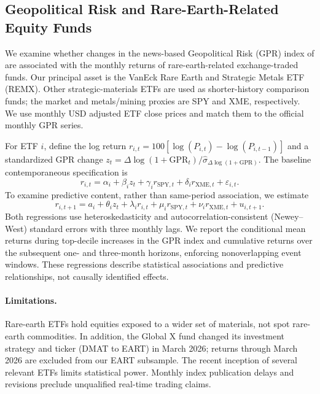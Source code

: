\subsection{Geopolitical Risk and Rare-Earth-Related Equity Funds}
We examine whether changes in the news-based Geopolitical Risk (GPR) index of
\citet{caldara_iacoviello_2022} are associated with the monthly returns of
rare-earth-related exchange-traded funds. Our principal asset is the VanEck Rare
Earth and Strategic Metals ETF (REMX). Other strategic-materials ETFs are used
as shorter-history comparison funds; the market and metals/mining proxies are
SPY and XME, respectively. We use monthly USD adjusted ETF close prices and
match them to the official monthly GPR series.

For ETF $i$, define the log return
$r_{i,t}=100[\log(P_{i,t})-\log(P_{i,t-1})]$ and a standardized GPR change
$z_t=\Delta\log(1+\mathrm{GPR}_t)/\widehat{\sigma}_{\Delta\log(1+\mathrm{GPR})}$.
The baseline contemporaneous specification is
\begin{equation}
 r_{i,t}=\alpha_i+\beta_i z_t+\gamma_i r_{\mathrm{SPY},t}
 +\delta_i r_{\mathrm{XME},t}+\varepsilon_{i,t}.
\end{equation}
To examine predictive content, rather than same-period association, we estimate
\begin{equation}
 r_{i,t+1}=a_i+\theta_i z_t+\lambda_i r_{i,t}
 +\mu_i r_{\mathrm{SPY},t}+\nu_i r_{\mathrm{XME},t}+u_{i,t+1}.
\end{equation}
Both regressions use heteroskedasticity and autocorrelation-consistent
(Newey--West) standard errors with three monthly lags. We report the
conditional mean returns during top-decile increases in the GPR index and
cumulative returns over the subsequent one- and three-month horizons, enforcing
nonoverlapping event windows. These regressions describe statistical
associations and predictive relationships, not causally identified effects.

\paragraph{Limitations.} Rare-earth ETFs hold equities exposed to a wider set
of materials, not spot rare-earth commodities. In addition, the Global X fund
changed its investment strategy and ticker (DMAT to EART) in March 2026;
returns through March 2026 are excluded from our EART subsample. The recent
inception of several relevant ETFs limits statistical power. Monthly index
publication delays and revisions preclude unqualified real-time trading claims.

